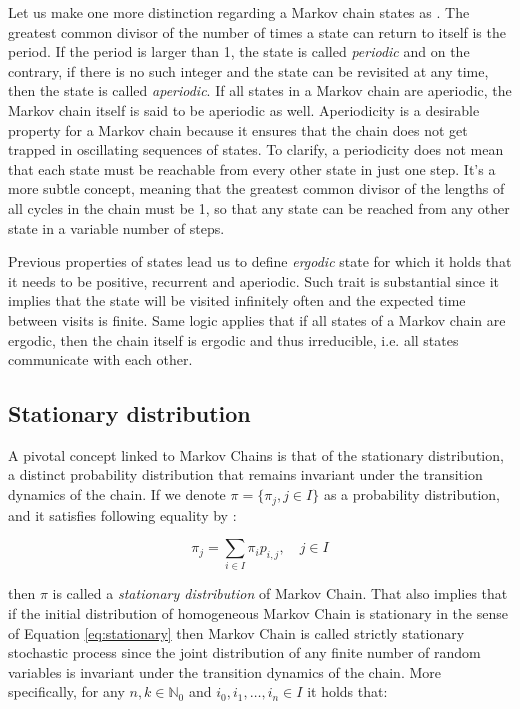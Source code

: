 Let us make one more distinction regarding a Markov chain states as \citep{Gebali2008}. The greatest common divisor of the number of times a state can return to itself is the period. If the period is larger than 1, the state is called \textit{periodic} and 
on the contrary, if there is no such integer and the state can be revisited at any time, then the state is called \textit{aperiodic}.
If all states in a Markov chain are aperiodic, the Markov chain itself is said to be aperiodic as well. Aperiodicity is a desirable property for a Markov chain because it ensures that the chain does not get trapped in oscillating sequences of states. 
To clarify, a periodicity does not mean that each state must be reachable from every other state in just one step. It's a more subtle concept, meaning that the greatest common divisor of the lengths of all cycles in the chain must be 1, so that any state can be reached from any other state in a variable number of steps.

Previous properties of states lead us to define \textit{ergodic} state for which it holds that it needs to be positive, recurrent and aperiodic. Such trait is substantial since it implies that the state will be visited infinitely often and the expected time between visits is finite.
Same logic applies that if all states of a Markov chain are ergodic, then the chain itself is ergodic and thus irreducible, i.e. all states communicate with each other.

\subsection{Stationary distribution}

A pivotal concept linked to Markov Chains is that of the stationary distribution, a distinct probability 
distribution that remains invariant under the transition dynamics of the chain. 
If we denote $\pi = \{\pi_j,j \in I\}$ as a probability distribution, and it satisfies following equality by \citep{Bremaud1999}:

\begin{equation} \label{eq:stationary}
    \pi_j = \sum_{i \in I} \pi_i p_{i,j}, \quad j \in I
\end{equation}

then $\pi$ is called a \textit{stationary distribution} of Markov Chain. That also implies that if the initial distribution of homogeneous Markov Chain is stationary in the sense of Equation \ref{eq:stationary}
then Markov Chain is called strictly stationary stochastic process since the joint distribution of any finite number of random variables is invariant under the transition dynamics of the chain.
More specifically, for any $n,k \in \mathbb{N}_0$ and $i_0,i_1,\ldots,i_n \in I$ it holds that:

